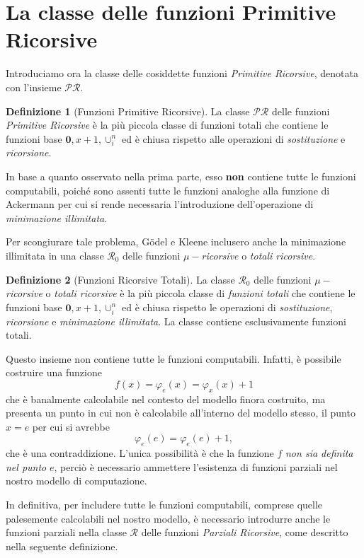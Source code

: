 \documentclass[10pt]{\classname}
\theoremstyle{newlinethm}
\theoremstyle{theorem}
\theoremstyle{definition}
\newtheorem{definizione}{Definizione}[section]
\theoremstyle{definition}
\theoremstyle{definition}
\theoremstyle{definition}
\begin{document}
\section{La classe delle funzioni Primitive Ricorsive}

Introduciamo ora la classe delle cosiddette funzioni \emph{Primitive Ricorsive}, denotata con l'insieme $\mathcal {PR}.$

\begin{definizione}[Funzioni Primitive Ricorsive]
    La classe $\mathcal {PR}$ delle funzioni \emph{Primitive Ricorsive} è la più piccola classe di funzioni totali che contiene le funzioni base $\bm{0}, x+1, \cup_i^n$ ed è chiusa rispetto alle operazioni di \emph{sostituzione} e \emph{ricorsione}.
\end{definizione}

In base a quanto osservato nella prima parte, esso \textbf{non} contiene tutte le funzioni computabili, poiché sono assenti tutte le funzioni analoghe alla funzione di Ackermann per cui si rende necessaria l'introduzione dell'operazione di \emph{minimazione illimitata}.

Per scongiurare tale problema, Gödel e Kleene inclusero anche la minimazione illimitata in una classe $\mathcal R_0$ delle funzioni $\mu-$\emph{ricorsive} o \emph{totali ricorsive}.

\begin{definizione}[Funzioni Ricorsive Totali]
    La classe $\mathcal R_0$ delle funzioni $\mu-$\emph{ricorsive} o \emph{totali ricorsive} è la più piccola classe di \emph{funzioni totali} che contiene le funzioni base $\bm{0}, x+1, \cup_i^n$ ed è chiusa rispetto le operazioni di \emph{sostituzione}, \emph{ricorsione} e \emph{minimazione illimitata}. La classe contiene esclusivamente funzioni totali.
\end{definizione}

Questo insieme non contiene tutte le funzioni computabili. Infatti, è possibile costruire una funzione \[f(x) = \varphi_e(x) = \varphi_x(x) + 1\] che è banalmente calcolabile nel contesto del modello finora costruito, ma presenta un punto in cui non è calcolabile all'interno del modello stesso, il punto $x=e$ per cui si avrebbe
\[\varphi_e(e) = \varphi_e(e) + 1,\] che è una contraddizione. L'unica possibilità è che la funzione $f$ \emph{non sia definita nel punto} $e$, perciò è necessario ammettere l'esistenza di funzioni parziali nel nostro modello di computazione.

In definitiva, per includere tutte le funzioni computabili, comprese quelle palesemente calcolabili nel nostro modello, è necessario introdurre anche le funzioni parziali nella classe $\mathcal {R}$ delle funzioni \emph{Parziali Ricorsive}, come descritto nella seguente definizione.
\end{document}
